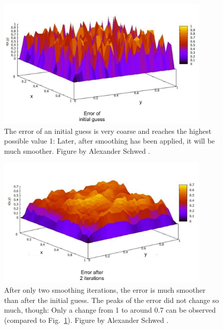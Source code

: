 \begin{figure}[tbp]
	\centering
	\includegraphics[width=0.9\textwidth]{chapters/chapter02/mg_error_smoothing_initial}
	\caption{The error of an initial guess is very coarse and reaches the highest possible value 1: Later, after smoothing has been applied, it will be much smoother. Figure by Alexander Schwed \cite{schwed}.}
	\label{fig:mg_error_smoothing_initial}
\end{figure}

\begin{figure}[tbp]
	\centering
	\includegraphics[width=0.9\textwidth]{chapters/chapter02/mg_error_smoothing_2}
	\caption{After only two smoothing iterations, the error is much smoother than after the initial guess. The peaks of the error did not change so much, though: Only a change from 1 to around 0.7 can be observed (compared to Fig.~\ref{fig:mg_error_smoothing_initial}). Figure by Alexander Schwed \cite{schwed}.}
	\label{fig:mg_error_smoothing_2}
\end{figure}

